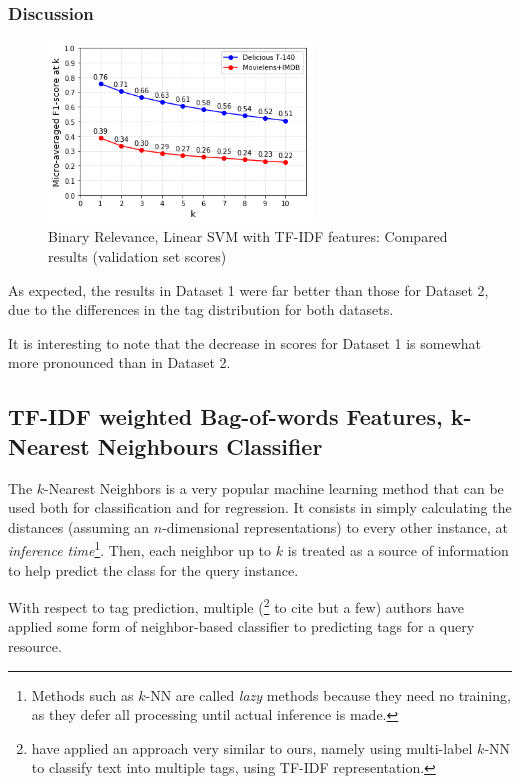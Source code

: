 \subsubsection{Discussion}

\begin{figure}[H]
    \centering
    \includegraphics[width=7cm]{chapters/05_experiments/images/proposal-1-compared-ovr-svm-bow.png}
    \caption{Binary Relevance, Linear SVM with TF-IDF features: Compared results (validation set scores)}
    \label{fig:compared_ovr_svm}
\end{figure}

As expected, the results in Dataset 1 were far better than those for Dataset 2, due to the differences in the tag distribution for both datasets.

It is interesting to note that the decrease in scores for Dataset 1 is somewhat more pronounced than in Dataset 2.

\subsection{TF-IDF weighted Bag-of-words Features, k-Nearest Neighbours Classifier}

The $k$-Nearest Neighbors is a very popular machine learning method that can be used both for classification and for regression. It consists in simply calculating the distances (assuming an $n$-dimensional representations) to every other instance, at \textit{inference time}\footnote{Methods such as $k$-NN are called \textit{lazy} methods because they need no training, as they defer all processing until actual inference is made.}. Then, each neighbor up to $k$ is treated as a source of information to help predict the class for the query instance. 

With respect to tag prediction, multiple (\cite{martinez_etal_2009,chidlovskii_2012,zhang_etal_2015,charte_etal_2015}\footnote{\cite{charte_etal_2015} have applied an approach very similar to ours, namely using multi-label $k$-NN to classify text into multiple tags, using TF-IDF representation. } to cite but a few) authors have applied some form of neighbor-based classifier to predicting tags for a query resource. 

